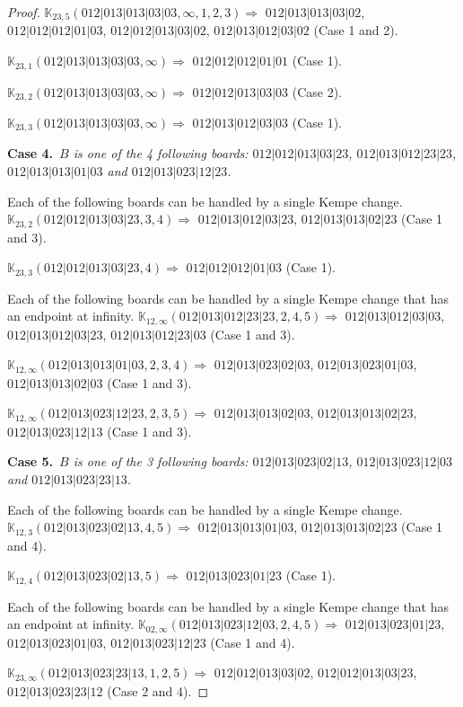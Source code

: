 \documentclass[12pt]{article}
\newcommand{\K}{\mathbb{K}}
\newcommand{\case}[2]{{\bf Case #1.}~{\it #2}~~}
\begin{document}
\begin{proof}
\bigskip

$\K_{23,5}(012|013|013|03|03,\infty,1, 2, 3)\Rightarrow $ $012|013|013|03|02$, $012|012|012|01|03$, $012|012|013|03|02$, $012|013|012|03|02$ (Case 1 and 2).

$\K_{23,1}(012|013|013|03|03,\infty)\Rightarrow $ $012|012|012|01|01$ (Case 1).

$\K_{23,2}(012|013|013|03|03,\infty)\Rightarrow $ $012|012|013|03|03$ (Case 2).

$\K_{23,3}(012|013|013|03|03,\infty)\Rightarrow $ $012|013|012|03|03$ (Case 1).


\bigskip


\bigskip
\case{4}{$B$ is one of the 4 following boards:
 $012|012|013|03|23$, $012|013|012|23|23$, $012|013|013|01|03$ and $012|013|023|12|23$.}

\bigskip

\bigskip

Each of the following boards can be handled by a single Kempe change.
$\K_{23,2}(012|012|013|03|23,3, 4)\Rightarrow $ $012|013|012|03|23$, $012|013|013|02|23$ (Case 1 and 3).

$\K_{23,3}(012|012|013|03|23,4)\Rightarrow $ $012|012|012|01|03$ (Case 1).


\bigskip

Each of the following boards can be handled by a single Kempe change that has an endpoint at infinity.
$\K_{12,\infty}(012|013|012|23|23,2, 4, 5)\Rightarrow $ $012|013|012|03|03$, $012|013|012|03|23$, $012|013|012|23|03$ (Case 1 and 3).

\bigskip

$\K_{12,\infty}(012|013|013|01|03,2, 3, 4)\Rightarrow $ $012|013|023|02|03$, $012|013|023|01|03$, $012|013|013|02|03$ (Case 1 and 3).

\bigskip

$\K_{12,\infty}(012|013|023|12|23,2, 3, 5)\Rightarrow $ $012|013|013|02|03$, $012|013|013|02|23$, $012|013|023|12|13$ (Case 1 and 3).

\bigskip


\bigskip
\case{5}{$B$ is one of the 3 following boards:
 $012|013|023|02|13$, $012|013|023|12|03$ and $012|013|023|23|13$.}

\bigskip

\bigskip

Each of the following boards can be handled by a single Kempe change.
$\K_{12,3}(012|013|023|02|13,4, 5)\Rightarrow $ $012|013|013|01|03$, $012|013|013|02|23$ (Case 1 and 4).

$\K_{12,4}(012|013|023|02|13,5)\Rightarrow $ $012|013|023|01|23$ (Case 1).


\bigskip

Each of the following boards can be handled by a single Kempe change that has an endpoint at infinity.
$\K_{02,\infty}(012|013|023|12|03,2, 4, 5)\Rightarrow $ $012|013|023|01|23$, $012|013|023|01|03$, $012|013|023|12|23$ (Case 1 and 4).

\bigskip

$\K_{23,\infty}(012|013|023|23|13,1, 2, 5)\Rightarrow $ $012|012|013|03|02$, $012|012|013|03|23$, $012|013|023|23|12$ (Case 2 and 4).

\bigskip

\end{proof}
\end{document}
